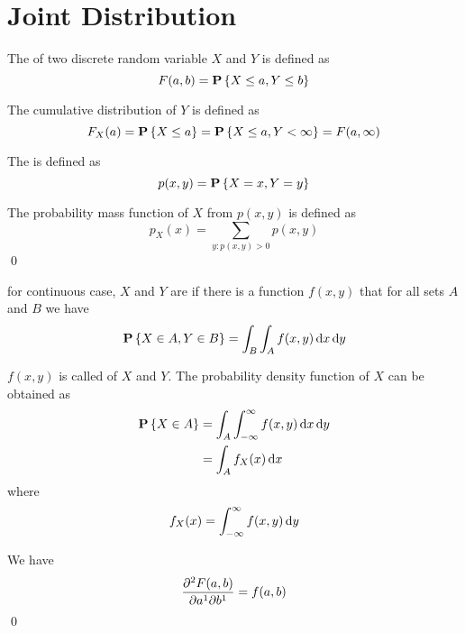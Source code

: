 \section{Joint Distribution}

\begin{definition}
    The  of two discrete random variable $X$ and $Y$ is defined as
    \begin{equation}
        F(a,b) = \mathop{\bf P\/}\displaystyle \left\{ X \leq a, Y \leq b \right\}
    \end{equation}
    
    The cumulative distribution of $Y$ is defined as
    \begin{equation}
        F_X(a) = \mathop{\bf P\/}\displaystyle \left\{X \leq a \right\} =\mathop{\bf P\/}\displaystyle \left\{X \leq a, Y < \infty \right\} = F(a, \infty)
    \end{equation}
    
    The  is defined as 
    \begin{equation}
        p(x,y) =\mathop{\bf P\/}\displaystyle \left\{X = x, Y = y\right\}
    \end{equation}
    
    The probability mass function of $X$ from $p(x,y)$ is defined as
    \begin{equation}
        p_X(x) = \displaystyle \sum_{y: p(x,y) > 0} p(x,y)
    \end{equation}
    \qed
\end{definition}


\begin{definition}
    for continuous case, $X$ and $Y$ are  if there is a function $f(x,y)$ that for all sets $A$ and $B$ we have 
\begin{equation}
    \probability{X \in A, Y \in B} = \int_B \int_A f(x,y) \dif{x} \dif{y}
\end{equation}

$f(x,y)$ is called  of $X$ and $Y$. The probability density function of $X$ can be obtained as
\begin{equation}
    \begin{aligned}
        \probability{X \in A} &= \int_A \int_{-\infty}^\infty f(x,y) \dif{x} \dif{y} \\
        &= \int_A f_X (x) \dif{x}
    \end{aligned}
\end{equation}
where
\begin{equation}
     f_X(x) = \int_{-\infty}^\infty f(x,y) \dif{y}
\end{equation}

We have 
\begin{equation}
    \dmd{F(a,b)}{2}{a}{1}{b}{1} = f(a,b)
\end{equation}
\qed
\end{definition}

